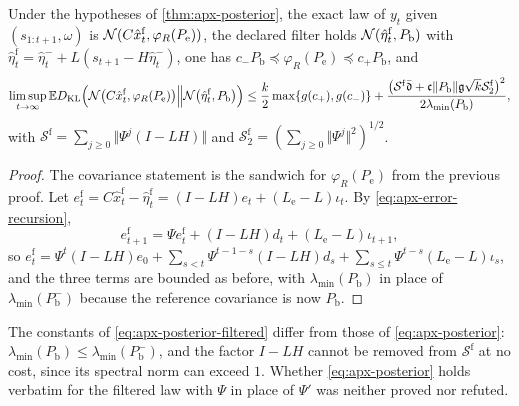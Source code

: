 \begin{proposition}\label{prop:apx-posterior-filtered}
Under the hypotheses of \cref{thm:apx-posterior}, the exact law of $y_t$ given $(s_{1:t+1},\omega)$ is $\mathcal{N}(C\hat x^{\mathrm f}_t,\varphi_R(P_{\mathrm e}))$, the declared filter holds $\mathcal{N}(\hat\eta^{\mathrm f}_t,P_{\mathrm b})$ with $\hat\eta^{\mathrm f}_t=\hat\eta^-_t+L(s_{t+1}-H\hat\eta^-_t)$, one has $c_-P_{\mathrm b}\preceq\varphi_R(P_{\mathrm e})\preceq c_+P_{\mathrm b}$, and
\begin{equation}\label{eq:apx-posterior-filtered}
\limsup_{t\to\infty}\mathbb{E}D_{\mathrm{KL}}\Bigl(\mathcal{N}\bigl(C\hat x^{\mathrm f}_t,\varphi_R(P_{\mathrm e})\bigr)\Big\Vert\mathcal{N}\bigl(\hat\eta^{\mathrm f}_t,P_{\mathrm b}\bigr)\Bigr)\le\frac k2\max\{g(c_+),g(c_-)\}+\frac{\bigl(\mathcal S^{\mathrm f}\bar{\mathfrak d}+\mathfrak c\Vert P_{\mathrm b}\Vert\mathfrak g\sqrt k\mathcal S^{\mathrm f}_2\bigr)^2}{2\lambda_{\min}(P_{\mathrm b})},
\end{equation}
with $\mathcal S^{\mathrm f}=\sum_{j\ge0}\Vert\Psi^j(I-LH)\Vert$ and $\mathcal S^{\mathrm f}_2=(\sum_{j\ge0}\Vert\Psi^j\Vert^2)^{1/2}$.
\end{proposition}

\begin{proof}
The covariance statement is the sandwich for $\varphi_R(P_{\mathrm e})$ from the previous proof. Let $e^{\mathrm f}_t=C\hat x^{\mathrm f}_t-\hat\eta^{\mathrm f}_t=(I-LH)e_t+(L_{\mathrm e}-L)\iota_t$. By \cref{eq:apx-error-recursion},
\begin{equation*}
e^{\mathrm f}_{t+1}=\Psi e^{\mathrm f}_t+(I-LH)d_t+(L_{\mathrm e}-L)\iota_{t+1},
\end{equation*}
so $e^{\mathrm f}_t=\Psi^t(I-LH)e_0+\sum_{s<t}\Psi^{t-1-s}(I-LH)d_s+\sum_{s\le t}\Psi^{t-s}(L_{\mathrm e}-L)\iota_s$, and the three terms are bounded as before, with $\lambda_{\min}(P_{\mathrm b})$ in place of $\lambda_{\min}(P^-_{\mathrm b})$ because the reference covariance is now $P_{\mathrm b}$.
\end{proof}

The constants of \cref{eq:apx-posterior-filtered} differ from those of \cref{eq:apx-posterior}: $\lambda_{\min}(P_{\mathrm b})\le\lambda_{\min}(P^-_{\mathrm b})$, and the factor $I-LH$ cannot be removed from $\mathcal S^{\mathrm f}$ at no cost, since its spectral norm can exceed $1$. Whether \cref{eq:apx-posterior} holds verbatim for the filtered law with $\Psi$ in place of $\Psi'$ was neither proved nor refuted.

